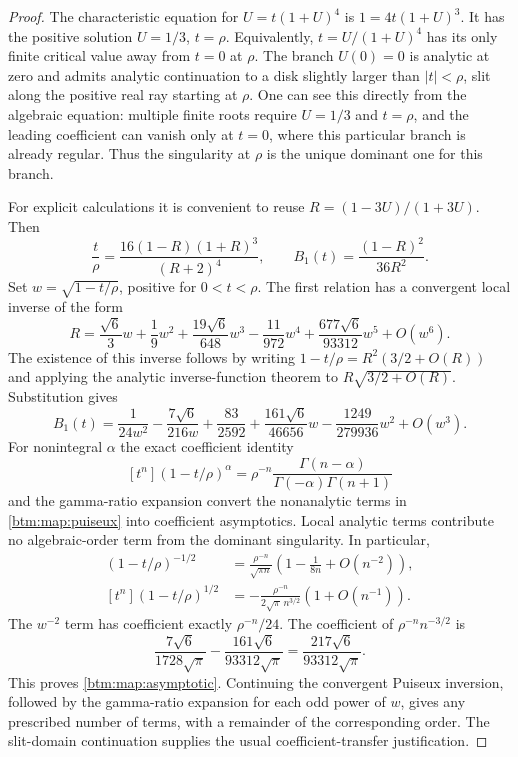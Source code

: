 \documentclass[11pt,letterpaper]{article}
\numberwithin{equation}{section}
\theoremstyle{definition}
\theoremstyle{remark}
\begin{document}
\begin{proof}
The characteristic equation for $U=t(1+U)^4$ is $1=4t(1+U)^3$.
It has the positive solution $U=1/3$, $t=\rho$.  Equivalently,
$t=U/(1+U)^4$ has its only finite critical value away from $t=0$ at
$\rho$.  The branch $U(0)=0$ is analytic at zero and admits analytic
continuation to a disk slightly larger than $|t|<\rho$, slit along the
positive real ray starting at $\rho$.  One can see this directly from
the algebraic equation: multiple finite roots require $U=1/3$ and
$t=\rho$, and the leading coefficient can vanish only at $t=0$,
where this particular branch is already regular.  Thus the singularity
at $\rho$ is the unique dominant one for this branch.

For explicit calculations it is convenient to reuse
$R=(1-3U)/(1+3U)$.  Then
\[
 \frac{t}{\rho}=
 \frac{16(1-R)(1+R)^3}{(R+2)^4},\qquad
 B_1(t)=\frac{(1-R)^2}{36R^2}.
\]
Set $w=\sqrt{1-t/\rho}$, positive for $0<t<\rho$.  The first relation
has a convergent local inverse of the form
\[
 R=\frac{\sqrt6}{3}w+\frac19w^2
       +\frac{19\sqrt6}{648}w^3-\frac{11}{972}w^4
       +\frac{677\sqrt6}{93312}w^5+O(w^6).
\]
The existence of this inverse follows by writing
$1-t/\rho=R^2(3/2+O(R))$ and applying the analytic inverse-function
theorem to $R\sqrt{3/2+O(R)}$.
Substitution gives
\begin{equation}
 \label{btm:map:puiseux}
 B_1(t)=\frac{1}{24w^2}-\frac{7\sqrt6}{216w}
        +\frac{83}{2592}
        +\frac{161\sqrt6}{46656}w
        -\frac{1249}{279936}w^2+O(w^3).
\end{equation}
For nonintegral $\alpha$ the exact coefficient identity
\[
 [t^n](1-t/\rho)^\alpha
 =\rho^{-n}\frac{\Gamma(n-\alpha)}{
                    \Gamma(-\alpha)\Gamma(n+1)}
\]
and the gamma-ratio expansion convert the nonanalytic terms in
\eqref{btm:map:puiseux} into coefficient asymptotics.  Local analytic terms
contribute no algebraic-order term from the dominant singularity.
In particular,
\begin{align*}
 [t^n](1-t/\rho)^{-1/2}
 &=\frac{\rho^{-n}}{\sqrt{\pi n}}
       \left(1-\frac1{8n}+O(n^{-2})\right),\\
 [t^n](1-t/\rho)^{1/2}
 &=-\frac{\rho^{-n}}{2\sqrt\pi\,n^{3/2}}
       \left(1+O(n^{-1})\right).
\end{align*}
The $w^{-2}$ term has coefficient exactly $\rho^{-n}/24$.
The coefficient of $\rho^{-n}n^{-3/2}$ is
\[
 \frac{7\sqrt6}{1728\sqrt\pi}
 -\frac{161\sqrt6}{93312\sqrt\pi}
 =\frac{217\sqrt6}{93312\sqrt\pi}.
\]
This proves \eqref{btm:map:asymptotic}.  Continuing the convergent Puiseux
inversion, followed by the gamma-ratio expansion for each odd power of
$w$, gives any prescribed number of terms, with a remainder of the
corresponding order.  The slit-domain continuation supplies the usual
coefficient-transfer justification.
\end{proof}
\end{document}
